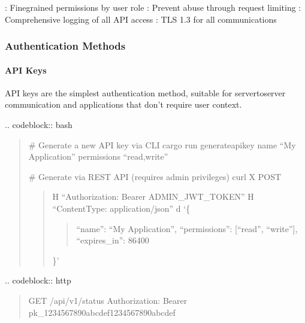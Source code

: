 \documentclass[letterpaper,10pt,english]{sphinxmanual}
\begin{document}
\sphinxAtStartPar
{}
\sphinxhyphen{} : Fine\sphinxhyphen{}grained permissions by user role
\sphinxhyphen{} : Prevent abuse through request limiting
\sphinxhyphen{} : Comprehensive logging of all API access
\sphinxhyphen{} : TLS 1.3 for all communications


\subsubsection{Authentication Methods}
\label{\detokenize{api/authentication:authentication-methods}}

\paragraph{API Keys}
\label{\detokenize{api/authentication:api-keys}}
\sphinxAtStartPar
API keys are the simplest authentication method, suitable for server\sphinxhyphen{}to\sphinxhyphen{}server communication and applications that don’t require user context.

\sphinxAtStartPar
{}
.. code\sphinxhyphen{}block:: bash
\begin{quote}

\sphinxAtStartPar
\# Generate a new API key via CLI
cargo run \textendash{} generate\sphinxhyphen{}api\sphinxhyphen{}key \textendash{}name “My Application” \textendash{}permissions “read,write”

\sphinxAtStartPar
\# Generate via REST API (requires admin privileges)
curl \sphinxhyphen{}X POST  
\begin{quote}

\sphinxAtStartPar
\sphinxhyphen{}H “Authorization: Bearer ADMIN\_JWT\_TOKEN” \sphinxhyphen{}H “Content\sphinxhyphen{}Type: application/json” \sphinxhyphen{}d ‘\{
\begin{quote}

\sphinxAtStartPar
“name”: “My Application”,
“permissions”: {[}“read”, “write”{]},
“expires\_in”: 86400
\end{quote}

\sphinxAtStartPar
\}’
\end{quote}
\end{quote}

\sphinxAtStartPar
{}
.. code\sphinxhyphen{}block:: http
\begin{quote}

\sphinxAtStartPar
GET /api/v1/status
Authorization: Bearer pk\_1234567890abcdef1234567890abcdef
\end{quote}
\end{document}
